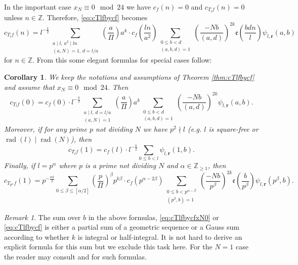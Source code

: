 \documentclass[12pt]{amsart}
\numberwithin{equation}{section}
\theoremstyle{plain}
\newtheorem{coro}[thm]{Corollary}
\theoremstyle{definition}
\theoremstyle{remark}
\newtheorem{rema}[thm]{Remark}
\newcommand\twoscript[2]{\substack{{#1} \\ {#2}}}
\newcommand\legendre[2]{\genfrac{(}{)}{}{}{#1}{#2}}
\newcommand\etp[1]{\mathfrak{e}\left(#1\right)}
\newcommand\rad{\mathop{\mathrm{rad}}}
\newcommand\numZ{\mathbb{Z}}
\newcommand\numgeq[2]{\mathbb{#1}_{\geq #2}}
\begin{document}
In the important case $x_N\equiv0\mod{24}$ we have $c_f(n)=0$ and $c_{T_lf}(n)=0$ unless $n\in\numZ$. Therefore, \eqref{eq:cTlfbycf} becomes
\begin{equation}
\label{eq:cTlfbycfxN0}
c_{T_lf}(n)=l^{-\frac{k}{2}}\sum_{\twoscript{a\mid l,\,a^2\mid ln}{(a,N)=1,\,d=l/a}}\legendre{a}{\varPi}a^k\cdot c_f\left(\frac{ln}{a^2}\right)\sum_{\twoscript{0\leq b<d}{(a,b,d)=1}}\legendre{-Nb}{(a,d)}^{2k}\etp{\frac{bdn}{l}}\psi_{l,\mathbf{r}}(a,b)
\end{equation}
for $n\in\numZ$. From this some elegant formulas for special cases follow:
\begin{coro}
We keep the notations and assumptions of Theorem \ref{thm:cTlfbycf} and assume that $x_N\equiv0\mod{24}$. Then
\begin{equation*}
c_{T_lf}(0)=c_f(0)\cdot l^{-\frac{k}{2}}\sum_{\twoscript{a\mid l,\,d=l/a}{(a,N)=1}}\legendre{a}{\varPi}a^k\sum_{\twoscript{0\leq b<d}{(a,b,d)=1}}\legendre{-Nb}{(a,d)}^{2k}\psi_{l,\mathbf{r}}(a,b).
\end{equation*}
Moreover, if for any prime $p$ not dividing $N$ we have $p^2\nmid l$ (e.g. $l$ is square-free or $\rad(l)\mid\rad(N)$), then
\begin{equation}
\label{eq:cTlfwhenlSquareFree}
c_{T_lf}(1)=c_f(l)\cdot l^{-\frac{k}{2}}\sum_{0\leq b<l}\psi_{l,\mathbf{r}}(1,b).
\end{equation}
Finally, if $l=p^\alpha$ where $p$ is a prime not dividing $N$ and $\alpha\in\numgeq{Z}{1}$, then
\begin{equation*}
c_{T_{p^\alpha}f}(1)=p^{-\frac{\alpha k}{2}}\sum_{0\leq\beta\leq[\alpha/2]}\legendre{p}{\varPi}^\beta p^{k\beta}\cdot c_f(p^{\alpha-2\beta})\sum_{\twoscript{0\leq b<p^{\alpha-\beta}}{(p^\beta,b)=1}}\legendre{-Nb}{p^\beta}^{2k}\etp{\frac{b}{p^\beta}}\psi_{l,\mathbf{r}}(p^\beta,b).
\end{equation*}
\end{coro}
\begin{rema}
The sum over $b$ in the above formulas, \eqref{eq:cTlfbycfxN0} or \eqref{eq:cTlfbycf} is either a partial sum of a geometric sequence or a Gauss sum according to whether $k$ is integral or half-integral. It is not hard to derive an explicit formula for this sum but we exclude this task here. For the $N=1$ case the reader may consult \cite[Eq. (58)]{ZZ23} and \cite[Lemma 5.6]{ZZ23} for such formulas.
\end{rema}
\end{document}
